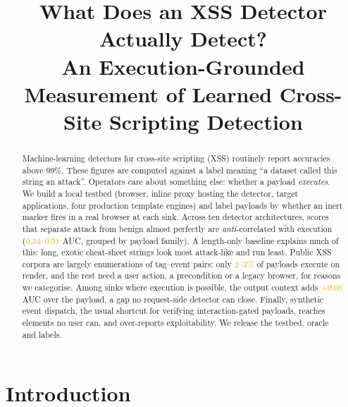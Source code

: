 \documentclass[sigconf,anonymous,review]{acmart}
\newcommand{\verify}[1]{\textcolor{orange}{#1}} %
\begin{document}
\title{What Does an XSS Detector Actually Detect?\\An Execution-Grounded Measurement of Learned Cross-Site Scripting Detection}

\begin{abstract}
Machine-learning detectors for cross-site scripting (XSS) routinely report accuracies above 99\%.
These figures are computed against a label meaning ``a dataset called this string an attack''.
Operators care about something else: whether a payload \emph{executes}.
We build a local testbed (browser, inline proxy hosting the detector, target applications,
four production template engines) and label payloads by whether an inert marker fires in a
real browser at each sink.
Across ten detector architectures, scores that separate attack from benign almost perfectly
are \emph{anti}-correlated with execution (\verify{0.34--0.51} AUC, grouped by payload family).
A length-only baseline explains much of this: long, exotic cheat-sheet strings look most
attack-like and run least.
Public XSS corpora are largely enumerations of tag--event pairs: only \verify{2--3\%} of payloads
execute on render, and the rest need a user action, a precondition or a legacy browser,
for reasons we categorise.
Among sinks where execution is possible, the output context adds \verify{+0.08} AUC over the
payload, a gap no request-side detector can close.
Finally, synthetic event dispatch, the usual shortcut for verifying interaction-gated
payloads, reaches elements no user can, and over-reports exploitability.
We release the testbed, oracle and labels.
\end{abstract}

\maketitle

\section{Introduction}
\end{document}
